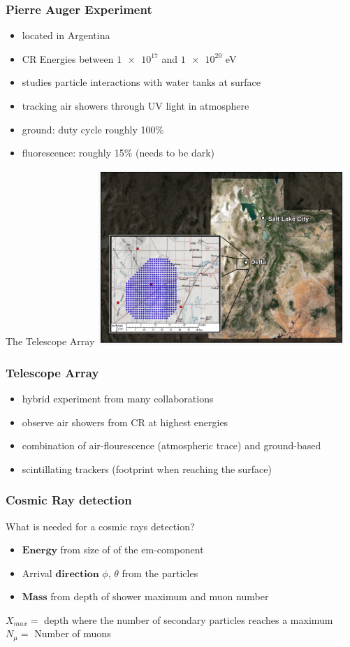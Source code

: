 \documentclass[aspectratio=1610, 9pt]{beamer}
\begin{document}
\begin{frame}\frametitle{Pierre Auger Experiment}
  \begin{itemize}
    \item located in Argentina
    \item CR Energies between $\num{1e17}$ and $\num{1e20}$ eV
    \item studies particle interactions with water tanks at surface
    \item tracking air showers through UV light in atmosphere
    \item ground: duty cycle roughly 100\%
    \item fluorescence: roughly 15\% (needs to be dark)
  \end{itemize}
\end{frame}

\begin{frame}{The Telescope Array}
  \includegraphics[width=0.7\textwidth]{TCA.png}
\end{frame}

\begin{frame}\frametitle{Telescope Array}
  \begin{itemize}
    \item hybrid experiment from many collaborations
    \item observe air showers from CR at highest energies
    \item combination of air-flourescence (atmospheric trace) and ground-based
    \item scintillating trackers (footprint when reaching the surface)
  \end{itemize}
\end{frame}

\begin{frame}\frametitle{Cosmic Ray detection}
  What is needed for a cosmic rays detection?
  \begin{itemize}
    \item $\symbf{Energy}$ from size of of the em-component
    \item Arrival $\symbf{direction}$ $\phi$, $\theta$ from the particles
    \item $\symbf{Mass}$ from depth of shower maximum and muon number
  \end{itemize}
  $X_{max} =$ depth where the number of secondary particles reaches a maximum \\
  $N_{\mu} =$ Number of muons
\end{frame}
\end{document}

